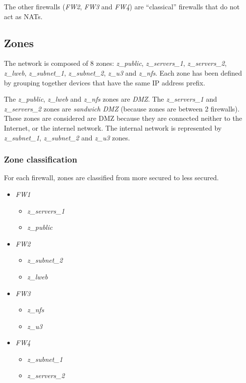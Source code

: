 \documentclass[a4paper, 12pt]{article}
\begin{document}
	The other firewalls (\emph{FW2}, \emph{FW3} and \emph{FW4}) are \enquote{classical} firewalls that do not act as NATs.
	
	\subsection{Zones}
	
	The network is composed of 8 zones: \emph{z\_public}, \emph{z\_servers\_1}, \emph{z\_servers\_2}, \emph{z\_lweb}, \emph{z\_subnet\_1}, \emph{z\_subnet\_2}, \emph{z\_u3} and \emph{z\_nfs}. Each zone has been defined by grouping together devices that have the same IP address prefix.
	
	The \emph{z\_public}, \emph{z\_lweb} and \emph{z\_nfs} zones are \emph{DMZ}. The \emph{z\_servers\_1} and \emph{z\_servers\_2} zones are \emph{sandwich DMZ} (because zones are between 2 firewalls). These zones are considered are DMZ because they are connected neither to the Internet, or the internel network. The internal network is represented by \emph{z\_subnet\_1}, \emph{z\_subnet\_2} and \emph{z\_u3} zones.
	
	\subsubsection{Zone classification}
	
	For each firewall, zones are classified from more secured to less secured.
	
	\begin{itemize}
	    \item \emph{FW1}
	    \begin{itemize}
	        \item \emph{z\_servers\_1}
	        \item \emph{z\_public}
	    \end{itemize}
	    \item \emph{FW2}
	    \begin{itemize}
	        \item \emph{z\_subnet\_2}
	        \item \emph{z\_lweb}
	    \end{itemize}
	    \item \emph{FW3}
	    \begin{itemize}
	        \item \emph{z\_nfs}
	        \item \emph{z\_u3}
	    \end{itemize}
	    \item \emph{FW4}
	    \begin{itemize}
	        \item \emph{z\_subnet\_1}
	        \item \emph{z\_servers\_2}
	    \end{itemize}
	\end{itemize}
	
\end{document}

